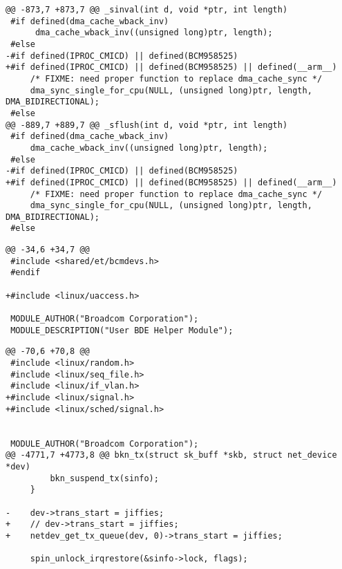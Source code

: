 \documentclass[a4paper]{article}
\begin{document}
\begin{lstlisting}[caption={systems/bde/linux/kernel/linux\_dma.c}]
@@ -873,7 +873,7 @@ _sinval(int d, void *ptr, int length)
 #if defined(dma_cache_wback_inv)
      dma_cache_wback_inv((unsigned long)ptr, length);
 #else
-#if defined(IPROC_CMICD) || defined(BCM958525)
+#if defined(IPROC_CMICD) || defined(BCM958525) || defined(__arm__)
     /* FIXME: need proper function to replace dma_cache_sync */
     dma_sync_single_for_cpu(NULL, (unsigned long)ptr, length, DMA_BIDIRECTIONAL);
 #else
@@ -889,7 +889,7 @@ _sflush(int d, void *ptr, int length)
 #if defined(dma_cache_wback_inv)
     dma_cache_wback_inv((unsigned long)ptr, length);
 #else
-#if defined(IPROC_CMICD) || defined(BCM958525)
+#if defined(IPROC_CMICD) || defined(BCM958525) || defined(__arm__)
     /* FIXME: need proper function to replace dma_cache_sync */
     dma_sync_single_for_cpu(NULL, (unsigned long)ptr, length, DMA_BIDIRECTIONAL);
 #else
\end{lstlisting}

\begin{lstlisting}[caption={systems/bde/linux/user/kernel/linux-user-bde.c}]
@@ -34,6 +34,7 @@
 #include <shared/et/bcmdevs.h>
 #endif

+#include <linux/uaccess.h>

 MODULE_AUTHOR("Broadcom Corporation");
 MODULE_DESCRIPTION("User BDE Helper Module");
\end{lstlisting}

\begin{lstlisting}[caption={systems/linux/kernel/modules/bcm-knet/bcm-knet.c}]
@@ -70,6 +70,8 @@
 #include <linux/random.h>
 #include <linux/seq_file.h>
 #include <linux/if_vlan.h>
+#include <linux/signal.h>
+#include <linux/sched/signal.h>


 MODULE_AUTHOR("Broadcom Corporation");
@@ -4771,7 +4773,8 @@ bkn_tx(struct sk_buff *skb, struct net_device *dev)
         bkn_suspend_tx(sinfo);
     }

-    dev->trans_start = jiffies;
+    // dev->trans_start = jiffies;
+    netdev_get_tx_queue(dev, 0)->trans_start = jiffies;

     spin_unlock_irqrestore(&sinfo->lock, flags);
\end{lstlisting}
\end{document}
